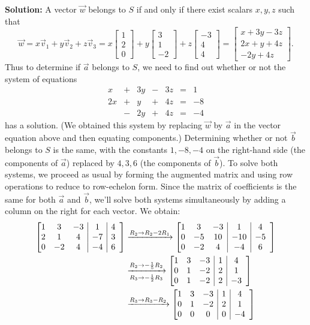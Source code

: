 \documentclass[12pt]{article}
\makeatletter
\newenvironment{abmatrix}[1]{%
  \left[\begin{array}{@{}*{#1}{c}|c|c}
}{%
  \end{array}\right]
}
\newcommand{\bbm}{\begin{bmatrix}}
\newcommand{\ebm}{\end{bmatrix}}
\makeatother
\begin{document}
\begin{enumerate}
\begin{enumerate}
\noindent\textbf{Solution:} A vector $\vec{w}$ belongs to $S$ if and only if there exist scalars $x,y,z$ such that
\[
 \vec{w} = x\vec{v}_1+y\vec{v}_2+z\vec{v}_3 = x\bbm 1\\2\\0\ebm + y\bbm 3\\1\\-2\ebm + z\bbm -3\\4\\4\ebm = \bbm x+3y-3z\\2x+y+4z\\-2y+4z\ebm.
\]
Thus to determine if $\vec{a}$ belongs to $S$, we need to find out whether or not the system of equations
\[
 \begin{array}{ccccccc}
  x&+&3y&-&3z&=&1\\
 2x&+&y&+&4z&=&-8\\
 & -&2y&+&4z&=&-4
 \end{array}
\]
has a solution. (We obtained this system by replacing $\vec{w}$ by $\vec{a}$ in the vector equation above and then equating components.) Determining whether or not $\vec{b}$ belongs to $S$ is the same, with the constants $1, -8, -4$ on the right-hand side (the components of $\vec{a}$) replaced by $4, 3, 6$ (the components of $\vec{b}$). To solve both systems, we proceed as usual by forming the augmented matrix and using row operations to reduce to row-echelon form. Since the matrix of coefficients is the same for both $\vec{a}$ and $\vec{b}$, we'll solve both systems simultaneously by adding a column on the right for each vector. We obtain:
\begin{align*}
 \begin{abmatrix}{3}
  1&3&-3&1&4\\
  2&1&4&-7&3\\
  0&-2&4&-4&6
 \end{abmatrix} &\xrightarrow{R_2\to R_2-2R_1}  \begin{abmatrix}{3}  1&3&-3&1&4\\0&-5&10&-10&-5\\0&-2&4&-4&6 \end{abmatrix}\\
&\xrightarrow[R_3\to -\frac{1}{2}R_3]{R_2\to -\frac{1}{5}R_2} \begin{abmatrix}{3} 1&3&-3&1&4\\0&1&-2&2&1\\0&1&-2&2&-3\end{abmatrix}\\
&\xrightarrow{R_3\to R_3-R_2}\begin{abmatrix}{3} 1&3&-3&1&4\\0&1&-2&2&1\\0&0&0&0&-4\end{abmatrix}\\

\end{align*}
\end{enumerate}
\end{enumerate}
\end{document}
